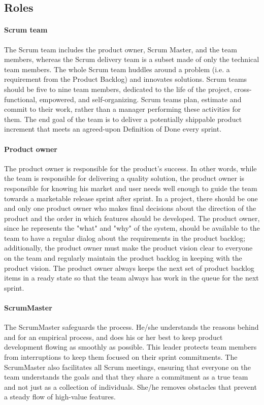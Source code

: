 \subsection{Roles}
\paragraph{Scrum team} The Scrum team includes the product owner, Scrum Master, and the team members, whereas the Scrum delivery team is a subset made of only the technical team members.
The whole Scrum team huddles around a problem (i.e. a requirement from the Product Backlog) and innovates solutions.
Scrum teams should be five to nine team members, dedicated to the life of the project, cross-functional, empowered, and self-organizing.
Scrum teams plan, estimate and commit to their work, rather than a manager performing these activities for them.
The end goal of the team is to deliver a potentially shippable product increment that meets an agreed-upon Definition of Done every sprint.

\paragraph{Product owner}
The product owner is responsible for the product's success.
In other words, while the team is responsible for delivering a quality solution, the product owner is responsible for knowing his market and user needs well enough to guide the team towards a marketable release sprint after sprint.
In a project, there should be one and only one product owner who makes final decisions about the direction of the product and the order in which features should be developed.
The product owner, since he represents the "what" and "why" of the system, should be available to the team to have a regular dialog about the requirements in the product backlog; additionally, the product owner must make the product vision clear to everyone on the team and regularly maintain the product backlog in keeping with the product vision.
The product owner always keeps the next set of product backlog items in a ready state so that the team always has work in the queue for the next sprint.

\paragraph{ScrumMaster}
The ScrumMaster safeguards the process.
He/she understands the reasons behind and for an empirical process, and does his or her best to keep product development flowing as smoothly as possible.
This leader protects team members from interruptions to keep them focused on their sprint commitments.
The ScrumMaster also facilitates all Scrum meetings, ensuring that everyone on the team understands the goals and that they share a commitment as a true team and not just as a collection of individuals.
She/he removes obstacles that prevent a steady flow of high-value features.

